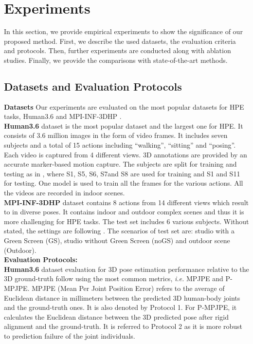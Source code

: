 \documentclass[runningheads]{llncs}
\newcommand{\latinphrase}[1]{\textit{#1}}
\newcommand{\ie}{\latinphrase{i.e.}\xspace}
\begin{document}
\section{Experiments}
\label{sec:evaluation}
In this section, we provide empirical experiments to show the significance of our proposed method. First, we describe the used datasets, the evaluation criteria and protocols. Then, further experiments are conducted along with ablation studies. Finally, we provide the comparisons with state-of-the-art methods. 
\subsection{Datasets and Evaluation Protocols}
\textbf{Datasets}
Our experiments are evaluated on the most popular datasets for HPE tasks, Human3.6 \cite{human} and MPI-INF-3DHP \cite{3DHP}.\\
\textbf{Human3.6} dataset is the most popular dataset and the largest one for HPE. It consists of 3.6 million images in the form of video frames. It includes seven subjects and a total of 15 actions including ``walking'', ``sitting'' and ``posing''. Each video is captured from 4 different views. 3D annotations are provided by an accurate marker-based motion capture. The subjects are split for training and testing as in \cite{pavllo20193d}, where S1, S5, S6, S7and S8 are used for training and S1 and S11 for testing. One model is used to train all the frames for the various actions. All the videos are recorded in indoor scenes.\\
\textbf{MPI-INF-3DHP} dataset contains 8 actions from 14 different views which result to in diverse poses. It contains indoor and outdoor complex scenes and thus it is more challenging for HPE tasks. The test set includes 6 various subjects. Without stated, the settings are following \cite{pavlakos2018ordinal}. The scenarios of test set are: studio with a Green Screen (GS), studio without Green Screen (noGS) and outdoor scene (Outdoor).
\\
\textbf{Evaluation Protocols:}\\
\textbf{Human3.6} dataset evaluation for 3D pose estimation performance relative to the 3D ground-truth  follow \cite{pavllo20193d} using the most common metrics, \ie MPJPE and P-MPJPE. MPJPE (Mean Per Joint Position Error) refers to the average of Euclidean distance in millimeters between the predicted 3D human-body joints and the ground-truth ones. It is also denoted by Protocol 1. For P-MPJPE, it calculates the Euclidean distance between the 3D predicted pose after rigid alignment and the ground-truth. It is referred to Protocol 2 as it is more robust to prediction failure of the joint individuals.\\
\end{document}
